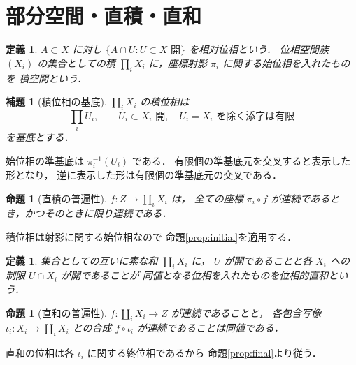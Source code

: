 \documentclass[a5paper,10pt,onecolumn]{jsarticle}
\makeatletter
\theoremstyle{mathnotetheorem}
\newtheorem{definition}[theorem]{定義}
\newtheorem{lemma}[theorem]{補題}
\newtheorem{proposition}[theorem]{命題}
\renewcommand{\proofname}{証明}
\renewenvironment{proof}[1][\proofname]{%
  \par\pushQED{\qed}\normalfont\topsep4\p@\@plus2\p@\relax
  \trivlist\item[\hskip\labelsep\bfseries #1]\ignorespaces
}{\popQED\endtrivlist\@endpefalse}
\makeatother
\begin{document}
\section{部分空間・直積・直和}
\begin{definition}
$A\subset X$ に対し
$\{A\cap U:U\subset X\text{ 開}\}$ を相対位相という．
位相空間族 $(X_i)$ の集合としての積
$\prod_iX_i$ に，座標射影 $\pi_i$ に関する始位相を入れたものを
積空間という．
\end{definition}
\begin{lemma}[積位相の基底]\label{lem:productbase}
$\prod_iX_i$ の積位相は
\[
 \prod_iU_i,\qquad
 U_i\subset X_i\text{ 開},\quad U_i=X_i\text{ を除く添字は有限}
\]
を基底とする．
\end{lemma}
\begin{proof}
始位相の準基底は $\pi_i^{-1}(U_i)$ である．
有限個の準基底元を交叉すると表示した形となり，
逆に表示した形は有限個の準基底元の交叉である．
\end{proof}
\begin{proposition}[直積の普遍性]
$f:Z\to\prod_iX_i$ は，
全ての座標 $\pi_i\circ f$ が連続であるとき，かつそのときに限り連続である．
\end{proposition}
\begin{proof}
積位相は射影に関する始位相なので
命題\ref{prop:initial}を適用する．
\end{proof}
\begin{definition}
集合としての互いに素な和 $\coprod_iX_i$ に，
$U$ が開であることと各 $X_i$ への制限 $U\cap X_i$ が開であることが
同値となる位相を入れたものを位相的直和という．
\end{definition}
\begin{proposition}[直和の普遍性]
$f:\coprod_iX_i\to Z$ が連続であることと，
各包含写像 $\iota_i:X_i\to\coprod_iX_i$ との合成
$f\circ\iota_i$ が連続であることは同値である．
\end{proposition}
\begin{proof}
直和の位相は各 $\iota_i$ に関する終位相であるから
命題\ref{prop:final}より従う．
\end{proof}
\end{document}

